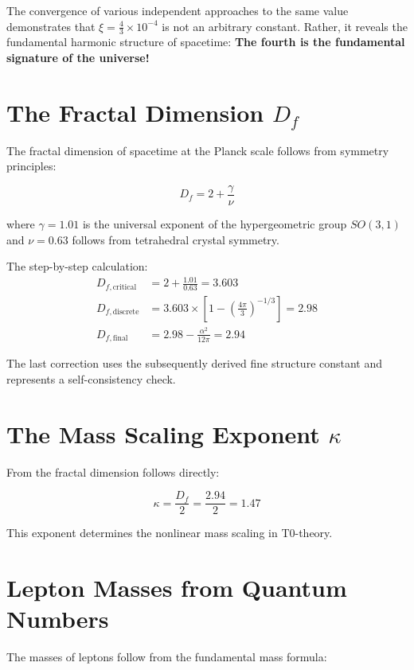 \documentclass[12pt,a4paper]{article}
\begin{document}
The convergence of various independent approaches to the same value demonstrates that $\xi = \frac{4}{3} \times 10^{-4}$ is not an arbitrary constant. Rather, it reveals the fundamental harmonic structure of spacetime: \textbf{The fourth is the fundamental signature of the universe!}
	\section{The Fractal Dimension $D_f$}
	
	The fractal dimension of spacetime at the Planck scale follows from symmetry principles:
	
	\begin{equation}
		D_f = 2 + \frac{\gamma}{\nu}
	\end{equation}
	
	where $\gamma = 1.01$ is the universal exponent of the hypergeometric group $SO(3,1)$ and $\nu = 0.63$ follows from tetrahedral crystal symmetry.
	
	The step-by-step calculation:
	\begin{align}
		D_{f,\text{critical}} &= 2 + \frac{1.01}{0.63} = 3.603\\
		D_{f,\text{discrete}} &= 3.603 \times \left[1 - \left(\frac{4\pi}{3}\right)^{-1/3}\right] = 2.98\\
		D_{f,\text{final}} &= 2.98 - \frac{\alpha^2}{12\pi} = 2.94
	\end{align}
	
	The last correction uses the subsequently derived fine structure constant and represents a self-consistency check.
	
	\section{The Mass Scaling Exponent $\kappa$}
	
	From the fractal dimension follows directly:
	
	\begin{equation}
		\kappa = \frac{D_f}{2} = \frac{2.94}{2} = 1.47
	\end{equation}
	
	This exponent determines the nonlinear mass scaling in T0-theory.
	
	\section{Lepton Masses from Quantum Numbers}
	
	The masses of leptons follow from the fundamental mass formula:
	
\end{document}
